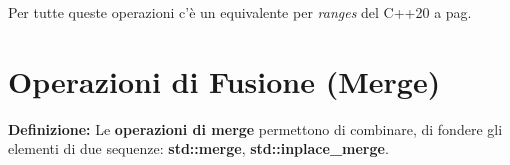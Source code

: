 \fleuron

\textsf{\small Per tutte queste operazioni c'è un equivalente per \emph{ranges} del C++20 a pag. \pageref{ranges}} \\




\newpage

\section{Operazioni di Fusione (Merge)}

\textsf{\small \textbf{Definizione: } Le \textbf{operazioni di merge} permettono di combinare, di fondere gli elementi di due sequenze: \textbf{std::merge}, \textbf{std::inplace\_merge}.} \\

